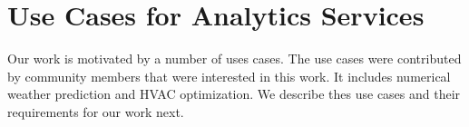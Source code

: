 
\section{Use Cases for Analytics Services}
\label{sec:usecases}

Our work is motivated by a number of uses cases. The use cases were
contributed by community members that were interested in this work.
It includes numerical weather prediction and HVAC optimization. We
describe thes use cases and their requirements for our work next.




